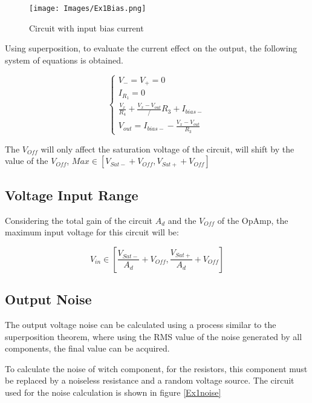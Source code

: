 \begin{figure}[H]
    \centering
    \texttt{[image: Images/Ex1Bias.png]}
    \caption{Circuit with input bias current}
    \label{Ex1Bias}
\end{figure}

Using superposition, to evaluate the current effect on the output, the following system of equations is obtained.


\begin{equation}
    \begin{cases}
    
        V_- = V_+ = 0 \\
        I_{R_1} = 0\\
        \frac{V_x}{R_4} + \frac{V_x - V_{out}}/R_3 + I_{bias-}\\
        V_{out} = I_{bias-} - \frac{V_x - V_{out}}{R_3}

    \end{cases}
\end{equation}

The $V_{Off}$ will only affect the saturation voltage of the circuit, will shift by the value of the $V_{Off}$, $Max \in [V_{Sat - } + V_{Off}, V_{Sat + } + V_{Off}]$

\subsection{Voltage Input Range}

Considering the total gain of the circuit $A_d$ and the $V_{Off}$ of the OpAmp, the maximum input voltage for this circuit will be:

\begin{equation}
   V_{in} \in [\frac{V_{Sat-}}{A_d} + V_{Off}, \frac{V_{Sat+}}{A_d} + V_{Off} ]
\end{equation}

\subsection{Output Noise}

The output voltage noise can be calculated using a process similar to the superposition theorem, where using the RMS value of the noise generated by all components, the final value can be acquired. 

To calculate the noise of witch component, for the resistors, this component must be replaced by a noiseless resistance and a random voltage source. The circuit used for the noise calculation is shown in figure \ref{Ex1noise}

